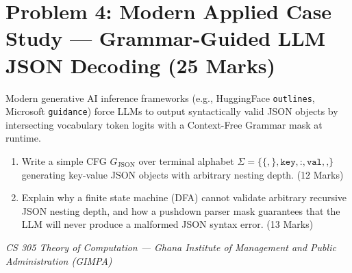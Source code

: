 \documentclass[11pt,a4paper]{article}
\begin{document}
\section*{Problem 4: Modern Applied Case Study --- Grammar-Guided LLM JSON Decoding (25 Marks)}
Modern generative AI inference frameworks (e.g., HuggingFace \texttt{outlines}, Microsoft \texttt{guidance}) force LLMs to output syntactically valid JSON objects by intersecting vocabulary token logits with a Context-Free Grammar mask at runtime.
\begin{enumerate}[label=\textbf{(\alph*)}]
    \item Write a simple CFG $G_{\text{JSON}}$ over terminal alphabet $\Sigma = \{\texttt{\{}, \texttt{\}}, \texttt{key}, \texttt{:}, \texttt{val}, \texttt{,}\}$ generating key-value JSON objects with arbitrary nesting depth. (12 Marks)
    \item Explain why a finite state machine (DFA) cannot validate arbitrary recursive JSON nesting depth, and how a pushdown parser mask guarantees that the LLM will never produce a malformed JSON syntax error. (13 Marks)
\end{enumerate}

\vfill
\begin{center}
    \small\color{darkgray}
    \textit{CS 305 Theory of Computation --- Ghana Institute of Management and Public Administration (GIMPA)}
\end{center}
\end{document}
